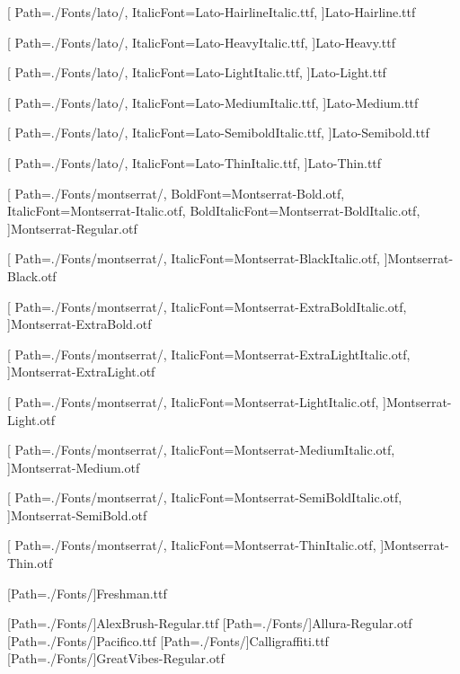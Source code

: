 \newfontfamily{\latohl}[
Path=./Fonts/lato/,
ItalicFont=Lato-HairlineItalic.ttf,
]{Lato-Hairline.ttf}

\newfontfamily{\latoh}[
Path=./Fonts/lato/,
ItalicFont=Lato-HeavyItalic.ttf,
]{Lato-Heavy.ttf}

\newfontfamily{\latol}[
Path=./Fonts/lato/,
ItalicFont=Lato-LightItalic.ttf,
]{Lato-Light.ttf}

\newfontfamily{\latol}[
Path=./Fonts/lato/,
ItalicFont=Lato-MediumItalic.ttf,
]{Lato-Medium.ttf}

\newfontfamily{\latos}[
Path=./Fonts/lato/,
ItalicFont=Lato-SemiboldItalic.ttf,
]{Lato-Semibold.ttf}

\newfontfamily{\latot}[
Path=./Fonts/lato/,
ItalicFont=Lato-ThinItalic.ttf,
]{Lato-Thin.ttf}

\newfontfamily{\montserrat}[
Path=./Fonts/montserrat/,
BoldFont=Montserrat-Bold.otf,
ItalicFont=Montserrat-Italic.otf,
BoldItalicFont=Montserrat-BoldItalic.otf,
]{Montserrat-Regular.otf}

\newfontfamily{\montserratb}[
Path=./Fonts/montserrat/,
ItalicFont=Montserrat-BlackItalic.otf,
]{Montserrat-Black.otf}

\newfontfamily{\montserrateb}[
Path=./Fonts/montserrat/,
ItalicFont=Montserrat-ExtraBoldItalic.otf,
]{Montserrat-ExtraBold.otf}

\newfontfamily{\montserratel}[
Path=./Fonts/montserrat/,
ItalicFont=Montserrat-ExtraLightItalic.otf,
]{Montserrat-ExtraLight.otf}

\newfontfamily{\montserratl}[
Path=./Fonts/montserrat/,
ItalicFont=Montserrat-LightItalic.otf,
]{Montserrat-Light.otf}

\newfontfamily{\montserratl}[
Path=./Fonts/montserrat/,
ItalicFont=Montserrat-MediumItalic.otf,
]{Montserrat-Medium.otf}

\newfontfamily{\montserrats}[
Path=./Fonts/montserrat/,
ItalicFont=Montserrat-SemiBoldItalic.otf,
]{Montserrat-SemiBold.otf}

\newfontfamily{\montserratt}[
Path=./Fonts/montserrat/,
ItalicFont=Montserrat-ThinItalic.otf,
]{Montserrat-Thin.otf}





\newfontfamily{\michigan}[Path=./Fonts/]{Freshman.ttf}

\newfontfamily{\alexbrush}[Path=./Fonts/]{AlexBrush-Regular.ttf}
\newfontfamily{\allura}[Path=./Fonts/]{Allura-Regular.otf}
\newfontfamily{\pacifico}[Path=./Fonts/]{Pacifico.ttf}
\newfontfamily{\calligraffiti}[Path=./Fonts/]{Calligraffiti.ttf}
\newfontfamily{\greatvibes}[Path=./Fonts/]{GreatVibes-Regular.otf}